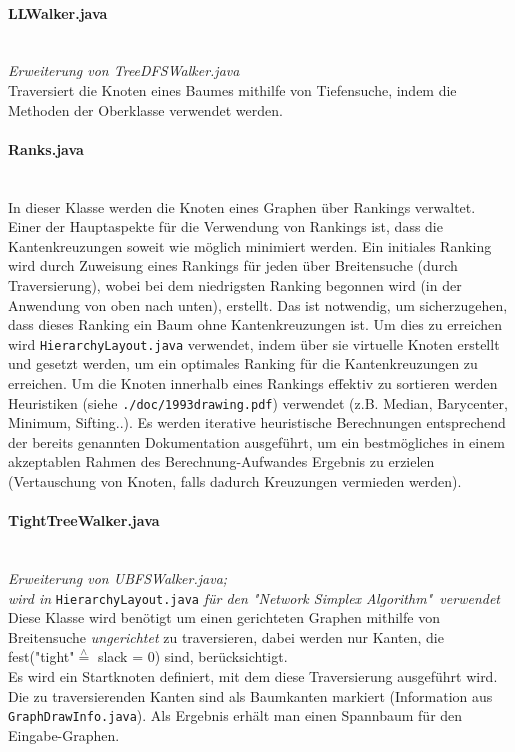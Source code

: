 \documentclass[10pt,a4paper]{article}
\begin{document}
\paragraph{LLWalker.java}\ \\
\emph{Erweiterung von TreeDFSWalker.java}\\
{\footnotesize Traversiert die Knoten eines Baumes mithilfe von Tiefensuche, indem die Methoden der Oberklasse verwendet werden.}

\paragraph{Ranks.java}\ \\
{\footnotesize In dieser Klasse werden die Knoten eines Graphen über Rankings verwaltet. Einer der Hauptaspekte für die Verwendung von Rankings ist, dass die Kantenkreuzungen soweit wie möglich minimiert werden. Ein initiales Ranking wird durch Zuweisung eines Rankings für jeden über Breitensuche (durch Traversierung), wobei bei dem niedrigsten Ranking begonnen wird (in der Anwendung von oben nach unten), erstellt. Das ist notwendig, um sicherzugehen, dass dieses Ranking ein Baum ohne Kantenkreuzungen ist. Um dies zu erreichen wird \texttt{HierarchyLayout.java} verwendet, indem über sie virtuelle Knoten erstellt und gesetzt werden, um ein optimales Ranking für die Kantenkreuzungen zu erreichen. Um die Knoten innerhalb eines Rankings effektiv zu sortieren werden Heuristiken (siehe \texttt{./doc/1993drawing.pdf}) verwendet (z.B. Median, Barycenter, Minimum, Sifting..). Es werden iterative heuristische Berechnungen entsprechend der bereits genannten Dokumentation ausgeführt, um ein bestmögliches in einem akzeptablen Rahmen des Berechnung-Aufwandes Ergebnis zu erzielen (Vertauschung von Knoten, falls dadurch Kreuzungen vermieden werden).}

\paragraph{TightTreeWalker.java}\ \\
\textit{Erweiterung von UBFSWalker.java;\\ wird in} {\small \texttt{HierarchyLayout.java}} \textit{für den "Network Simplex Algorithm"\ verwendet}\\
{\footnotesize Diese Klasse wird benötigt um einen gerichteten Graphen mithilfe von Breitensuche \textit{ungerichtet} zu traversieren, dabei werden nur Kanten, die fest("tight"$\overset{\wedge}{=}$ slack = 0) sind, berücksichtigt. \\
Es wird ein Startknoten definiert, mit dem diese Traversierung ausgeführt wird. Die zu traversierenden Kanten sind als Baumkanten markiert (Information aus \texttt{GraphDrawInfo.java}). Als Ergebnis erhält man einen Spannbaum für den Eingabe-Graphen.}
\end{document}
